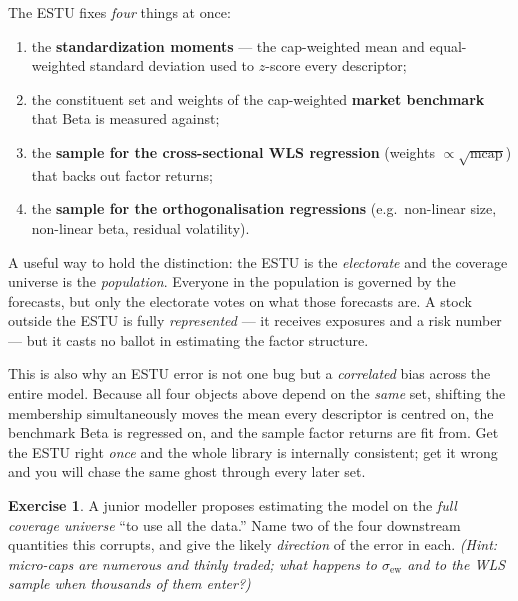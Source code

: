 \documentclass[11pt]{article}
\theoremstyle{definition}
\newtheorem{exercise}{Exercise}[section]
\theoremstyle{plain}
\theoremstyle{remark}
\begin{document}
\begin{keyresult}
The ESTU fixes \emph{four} things at once:
\begin{enumerate}[nosep,leftmargin=1.6em]
  \item the \textbf{standardization moments} --- the cap-weighted mean and equal-weighted standard deviation used to $z$-score every descriptor;
  \item the constituent set and weights of the cap-weighted \textbf{market benchmark} that Beta is measured against;
  \item the \textbf{sample for the cross-sectional WLS regression} (weights $\propto\sqrt{\text{mcap}}$) that backs out factor returns;
  \item the \textbf{sample for the orthogonalisation regressions} (e.g.\ non-linear size, non-linear beta, residual volatility).
\end{enumerate}
\end{keyresult}

\begin{intuition}
A useful way to hold the distinction: the ESTU is the \emph{electorate} and the coverage universe is the \emph{population}. Everyone in the population is governed by the forecasts, but only the electorate votes on what those forecasts are. A stock outside the ESTU is fully \emph{represented} --- it receives exposures and a risk number --- but it casts no ballot in estimating the factor structure.

This is also why an ESTU error is not one bug but a \emph{correlated} bias across the entire model. Because all four objects above depend on the \emph{same} set, shifting the membership simultaneously moves the mean every descriptor is centred on, the benchmark Beta is regressed on, and the sample factor returns are fit from. Get the ESTU right \emph{once} and the whole library is internally consistent; get it wrong and you will chase the same ghost through every later set.
\end{intuition}

\begin{exercise}
A junior modeller proposes estimating the model on the \emph{full coverage universe} ``to use all the data.'' Name two of the four downstream quantities this corrupts, and give the likely \emph{direction} of the error in each. \emph{(Hint: micro-caps are numerous and thinly traded; what happens to $\sigma_{\text{ew}}$ and to the WLS sample when thousands of them enter?)}
\end{exercise}
\end{document}
